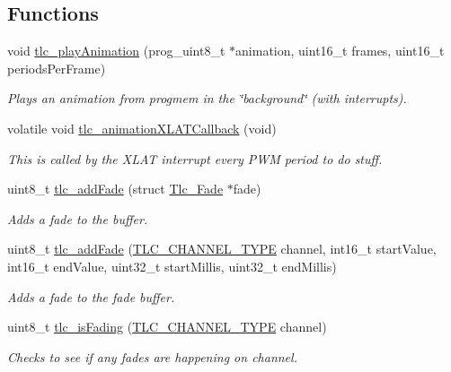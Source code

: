 \subsection*{Functions}
\begin{DoxyCompactItemize}
\item 
void \hyperlink{group__ExtendedFunctions_ga587f08f4ed1ae1d1c8e87720be52fa62}{tlc\+\_\+play\+Animation} (prog\+\_\+uint8\+\_\+t $\ast$animation, uint16\+\_\+t frames, uint16\+\_\+t periods\+Per\+Frame)
\begin{DoxyCompactList}\small\item\em Plays an animation from progmem in the \char`\"{}background\char`\"{} (with interrupts). \end{DoxyCompactList}\item 
volatile void \hyperlink{group__ExtendedFunctions_ga9b568baea2ed82ae278925596a412cd7}{tlc\+\_\+animation\+X\+L\+A\+T\+Callback} (void)
\begin{DoxyCompactList}\small\item\em This is called by the X\+L\+AT interrupt every P\+WM period to do stuff. \end{DoxyCompactList}\item 
uint8\+\_\+t \hyperlink{group__ExtendedFunctions_ga5af78538816f1331f3d1977b6feaa2df}{tlc\+\_\+add\+Fade} (struct \hyperlink{structTlc__Fade}{Tlc\+\_\+\+Fade} $\ast$fade)
\begin{DoxyCompactList}\small\item\em Adds a fade to the buffer. \end{DoxyCompactList}\item 
uint8\+\_\+t \hyperlink{group__ExtendedFunctions_gac32743e3ae17199f6d91bea66410a6c5}{tlc\+\_\+add\+Fade} (\hyperlink{tlc__config_8h_ab23dc44a3be02131509f5ab61f68530e}{T\+L\+C\+\_\+\+C\+H\+A\+N\+N\+E\+L\+\_\+\+T\+Y\+PE} channel, int16\+\_\+t start\+Value, int16\+\_\+t end\+Value, uint32\+\_\+t start\+Millis, uint32\+\_\+t end\+Millis)
\begin{DoxyCompactList}\small\item\em Adds a fade to the fade buffer. \end{DoxyCompactList}\item 
uint8\+\_\+t \hyperlink{group__ExtendedFunctions_ga3ba34d1e1519c8f742b364958bced96f}{tlc\+\_\+is\+Fading} (\hyperlink{tlc__config_8h_ab23dc44a3be02131509f5ab61f68530e}{T\+L\+C\+\_\+\+C\+H\+A\+N\+N\+E\+L\+\_\+\+T\+Y\+PE} channel)
\begin{DoxyCompactList}\small\item\em Checks to see if any fades are happening on channel. \end{DoxyCompactList}\item 

\end{DoxyCompactItemize}
